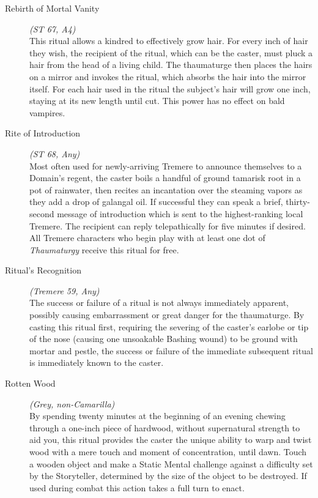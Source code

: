\begin{description}
	\item[Rebirth of Mortal Vanity] \emph{(ST 67, A4)} \hfill \\
	This ritual allows a kindred to effectively grow hair.  For every inch of hair they wish, the recipient of the ritual, which 
	can be the caster, must pluck a hair from the head of a living child.  The thaumaturge then places the hairs on a mirror and 
	invokes the ritual, which absorbs the hair into the mirror itself.  For each hair used in the ritual the subject's hair will 
	grow one inch, staying at its new length until cut.  This power has no effect on bald vampires. \\

	\item[Rite of Introduction] \emph{(ST 68, Any)} \hfill \\
	Most often used for newly-arriving Tremere to announce themselves to a Domain's regent, the caster boils a handful of ground 
	tamarisk root in a pot of rainwater, then recites an incantation over the steaming vapors as they add a drop of galangal oil.  
	If successful they can speak a brief, thirty-second message of introduction which is sent to the highest-ranking local Tremere.  
	The recipient can reply telepathically for five minutes if desired.  All Tremere characters who begin play with at least one 
	dot of \emph{Thaumaturgy} receive this ritual for free. \\

	\item[Ritual's Recognition] \emph{(Tremere 59, Any)} \hfill \\
	The success or failure of a ritual is not always immediately apparent, possibly causing embarrassment or great danger for the 
	thaumaturge.  By casting this ritual first, requiring the severing of the caster's earlobe or tip of the nose (causing one 
	unsoakable Bashing wound) to be ground with mortar and pestle, the success or failure of the immediate subsequent ritual is 
	immediately known to the caster. \\

	\item[Rotten Wood] \emph{(Grey, non-Camarilla)} \hfill \\
	By spending twenty minutes at the beginning of an evening chewing through a one-inch piece of hardwood, without supernatural 
	strength to aid you, this ritual provides the caster the unique ability to warp and twist wood with a mere touch and moment of 
	concentration, until dawn.  Touch a wooden object and make a Static Mental challenge against a difficulty set by the Storyteller, 
	determined by the size of the object to be destroyed.  If used during combat this action takes a full turn to enact. \\


\end{description}
